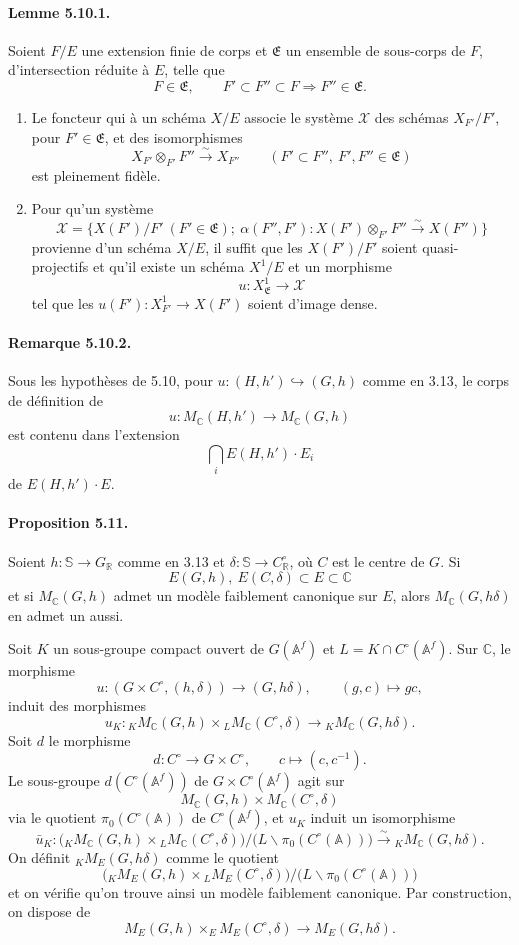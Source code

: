 \documentclass[10pt]{article}
\newcommand{\A}{\mathbb A}
\newcommand{\Af}{\mathbb A^f}
\newcommand{\C}{\mathbb C}
\newcommand{\R}{\mathbb R}
\newcommand{\bS}{\mathbb S}
\newcommand{\MC}{M_{\C}}
\begin{document}
\paragraph{Lemme 5.10.1.} Soient $F/E$ une extension finie de corps et $\mathfrak E$ un ensemble de sous-corps de $F$, d'intersection réduite à $E$, telle que
\[
F\in\mathfrak E,\qquad F'\subset F''\subset F\Longrightarrow F''\in\mathfrak E.
\]
\begin{enumerate}[label=(\roman*)]
\item Le foncteur qui à un schéma $X/E$ associe le système $\mathcal X$ des schémas $X_{F'}/F'$, pour $F'\in\mathfrak E$, et des isomorphismes
\[
X_{F'}\otimes_{F'}F''\xrightarrow{\sim}X_{F''}\qquad(F'\subset F'',\ F',F''\in\mathfrak E)
\]
est pleinement fidèle.
\item Pour qu'un système
\[
\mathcal X=\{X(F')/F'\ (F'\in\mathfrak E);\ \alpha(F'',F'):X(F')\otimes_{F'}F''\xrightarrow{\sim}X(F'')\}
\]
provienne d'un schéma $X/E$, il suffit que les $X(F')/F'$ soient quasi-projectifs et qu'il existe un schéma $X^1/E$ et un morphisme
\[
u:X^1_{\mathfrak E}\longrightarrow\mathcal X
\]
tel que les $u(F'):X^1_{F'}\to X(F')$ soient d'image dense.
\end{enumerate}

\paragraph{Remarque 5.10.2.} Sous les hypothèses de 5.10, pour $u:(H,h')\hookrightarrow(G,h)$ comme en 3.13, le corps de définition de
\[
u:\MC(H,h')\longrightarrow\MC(G,h)
\]
est contenu dans l'extension
\[
\bigcap_i E(H,h')\cdot E_i
\]
de $E(H,h')\cdot E$.

\paragraph{Proposition 5.11.} Soient $h:\bS\to G_\R$ comme en 3.13 et $\delta:\bS\to C^\circ_\R$, où $C$ est le centre de $G$. Si
\[
E(G,h),\ E(C,\delta)\subset E\subset\C
\]
et si $\MC(G,h)$ admet un modèle faiblement canonique sur $E$, alors $\MC(G,h\delta)$ en admet un aussi.

Soit $K$ un sous-groupe compact ouvert de $G(\Af)$ et $L=K\cap C^\circ(\Af)$. Sur $\C$, le morphisme
\[
u:(G\times C^\circ,(h,\delta))\longrightarrow(G,h\delta),\qquad (g,c)\longmapsto gc,
\]
induit des morphismes
\[
u_K:{}_K\MC(G,h)\times {}_L\MC(C^\circ,\delta)
 \longrightarrow {}_K\MC(G,h\delta).
\]
Soit $d$ le morphisme
\[
d:C^\circ\longrightarrow G\times C^\circ,\qquad c\longmapsto(c,c^{-1}).
\]
Le sous-groupe $d(C^\circ(\Af))$ de $G\times C^\circ(\Af)$ agit sur
\[
\MC(G,h)\times\MC(C^\circ,\delta)
\]
via le quotient $\pi_0(C^\circ(\A))$ de $C^\circ(\Af)$, et $u_K$ induit un isomorphisme
\[
\bar u_K:\bigl({}_K\MC(G,h)\times{}_L\MC(C^\circ,\delta)\bigr)/
\bigl(L\backslash\pi_0(C^\circ(\A))\bigr)
\xrightarrow{\sim}{}_K\MC(G,h\delta).
\]
On définit ${}_K M_E(G,h\delta)$ comme le quotient
\[
\bigl({}_K M_E(G,h)\times{}_L M_E(C^\circ,\delta)\bigr)/
\bigl(L\backslash\pi_0(C^\circ(\A))\bigr)
\]
et on vérifie qu'on trouve ainsi un modèle faiblement canonique. Par construction, on dispose de
\[
\tag{5.11.1}
M_E(G,h)\times_E M_E(C^\circ,\delta)\longrightarrow M_E(G,h\delta).
\]
\end{document}
